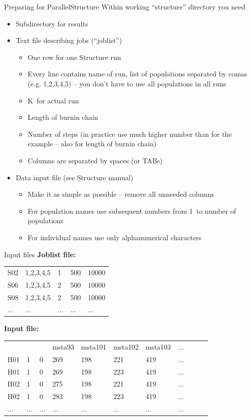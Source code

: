 \documentclass[compress, ucs, xelatex, 11pt, xcolor=svgnames,
  hyperref={
    bookmarks=true,
    unicode=true,
    colorlinks=true,
    pdftitle={Molecular data in R},
    plainpages=false,
    pdfauthor={Vojtech Zeisek},
    pdfsubject={Course about phylogeny and evolution in R},
    pdfcreator={XeLaTeX},
    pdfkeywords={R, evolution, phylogeny, molecular data},
    linkcolor=Tomato,
    anchorcolor=SaddleBrown,
    citecolor=Goldenrod,
    filecolor=DarkMagenta,
    menucolor=Sienna,
    urlcolor=DarkTurquoise,
    pdftex},
  url={hyphens, lowtilde} %
  ]{beamer}
\begin{document}
\begin{frame}{Preparing for ParallelStructure}
  Within working ``structure'' directory you need
  \begin{itemize}
    \item Subdirectory for results
    \item Text file describing jobs (``joblist'')
      \begin{itemize}
	\item One row for one Structure run
	\item Every line contains name of run, list of populations separated by comas (e.g. 1,2,3,4,5) -- you don't have to use all populations in all runs
	\item K~for actual run
	\item Length of burnin chain
	\item Number of steps (in practice use much higher number than for the example -- also for length of burnin chain)
	\item Columns are separated by spaces (or TABs)
      \end{itemize}
    \item Data input file (see Structure manual)
      \begin{itemize}
	\item Make it as simple as possible -- remove all unneeded columns
	\item For population names use subsequent numbers from 1~to number of populations
	\item For individual names use only alphanumerical characters
    \end{itemize}
  \end{itemize}
\end{frame}

\begin{frame}[fragile]{Input files}
  \textbf{Joblist file:}\\
  \begin{tabular}{lllll}
    S02 & 1,2,3,4,5 & 1 & 500 & 10000\\
    S06 & 1,2,3,4,5 & 2 & 500 & 10000\\
    S08 & 1,2,3,4,5 & 2 & 500 & 10000\\
    ... & ... & ... & ... & ...\\
  \end{tabular}
  \vfill
  \textbf{Input file:}\\
  \begin{tabular}{lllllllllll}
    & & & msta93 & msta101 & msta102 & msta103 & ...\\
    H01 & 1 & 0 & 269 & 198 & 221 & 419 & ...\\
    H01 & 1 & 0 & 269 & 198 & 223 & 419 & ...\\
    H02 & 1 & 0 & 275 & 198 & 221 & 419 & ...\\
    H02 & 1 & 0 & 283 & 198 & 223 & 419 & ...\\
    ... & ... & ... & ... & ... & ... & ... & ...
  \end{tabular}
\end{frame}
\end{document}
